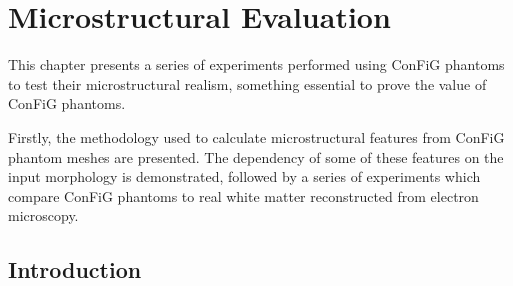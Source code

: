 \chapter{Microstructural Evaluation}
\label{chap:microstructure_eval}

\chaptertoc{}

\begin{chapterabstract}
  This chapter presents a series of experiments performed using ConFiG phantoms to test their microstructural realism, something essential to prove the value of ConFiG phantoms.

  Firstly, the methodology used to calculate microstructural features from ConFiG phantom meshes are presented. The dependency of some of these features on the input morphology is demonstrated, followed by a series of experiments which compare ConFiG phantoms to real white matter reconstructed from electron microscopy.
\end{chapterabstract}



\section{Introduction}
\label{sec:micro_introduction}


